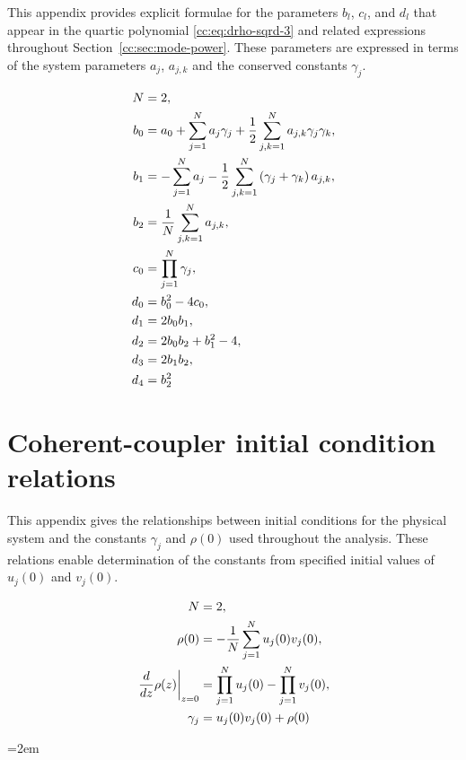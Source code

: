 \documentclass[11pt,a4paper]{article}
\numberwithin{equation}{section}
\begin{document}
This appendix provides explicit formulae for the parameters $b_l$, $c_l$, and $d_l$ that appear in the quartic polynomial \eqref{cc:eq:drho-sqrd-3} and related expressions throughout Section~\ref{cc:sec:mode-power}.
These parameters are expressed in terms of the system parameters $a_j$, $a_{j,k}$ and the conserved constants $\gamma_j$.

\begin{align}
N &= 2,\\
{b}_{0} &= {a}_{0} + \sum_{j=1}^{N} {a}_{j} {\gamma}_{j} + \frac{1}{2}\sum\limits_{j,k=1}^{N} {a}_{j,k} {\gamma}_{j} {\gamma}_{k}, \notag \\
{b}_{1} &= - \sum_{j=1}^{N} {a}_{j} - \frac{1}{2}\sum\limits_{j,k=1}^{N} \left({\gamma}_{j} + {\gamma}_{k}\right) {a}_{j,k}, \notag \\
{b}_{2} &= \frac{1}{N}\sum\limits_{j,k=1}^{N} {a}_{j,k}, \notag \\
{c}_{0} &= \prod_{j=1}^{N} {\gamma}_{j}, \notag \\
{d}_{0} &= {b}_{0}^{2} - 4 {c}_{0}, \notag \\
{d}_{1} &= 2 {b}_{0} {b}_{1}, \notag \\
{d}_{2} &= 2 {b}_{0} {b}_{2} + {b}_{1}^{2} - 4, \notag \\
{d}_{3} &= 2 {b}_{1} {b}_{2}, \notag \\
{d}_{4} &= {b}_{2}^{2}
\end{align}


\section{Coherent-coupler initial condition relations}
\label{cc:app:init-conds}

This appendix gives the relationships between initial conditions for the physical system and the constants $\gamma_j$ and $\rho(0)$ used throughout the analysis.
These relations enable determination of the constants from specified initial values of $u_j(0)$ and $v_j(0)$.

\begin{align}
N &= 2, \notag \\
\rho{\left(0 \right)} &= - \frac{1}{N}\sum_{j=1}^{N} u_j{\left(0 \right)} v_j{\left(0 \right)}, \notag \\
\left. \frac{d}{d z} \rho{\left(z \right)} \right|_{\substack{ z=0 }} &= \prod_{j=1}^{N} u_j(0) - \prod_{j=1}^{N} v_j(0), \notag \\
{\gamma}_{j} &= u_j{\left(0\right)} v_j{\left(0 \right)} + \rho{\left(0 \right)}
\end{align}



\begingroup
\emergencystretch=2em
\printbibliography
\endgroup
\end{document}

